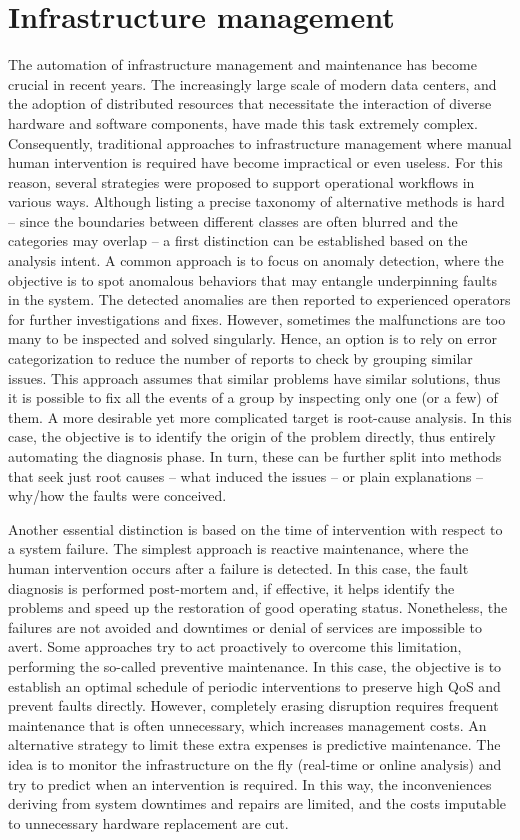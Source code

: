 \chapter{Infrastructure management} \label{ch:opint}
The automation of infrastructure management and maintenance has become crucial in recent years. 
The increasingly large scale of modern data centers, and the adoption of distributed resources that necessitate the interaction of diverse hardware and software components, have made this task extremely complex. Consequently, traditional approaches to infrastructure management where manual human intervention is required have become impractical or even useless. 
For this reason, several strategies were proposed to support operational workflows in various ways.
Although listing a precise taxonomy of alternative methods is hard -- since the boundaries between different classes are often blurred and the categories may overlap -- a first distinction can be established based on the analysis intent.
A common approach is to focus on anomaly detection, where the objective is to spot anomalous behaviors that may entangle underpinning faults in the system. The detected anomalies are then reported to experienced operators for further investigations and fixes.
However, sometimes the malfunctions are too many to be inspected and solved singularly. Hence, an option is to rely on error categorization to reduce the number of reports to check by grouping similar issues. This approach assumes that similar problems have similar solutions, thus it is possible to fix all the events of a group by inspecting only one (or a few) of them.
A more desirable yet more complicated target is root-cause analysis. In this case, the objective is to identify the origin of the problem directly, thus entirely automating the diagnosis phase.
In turn, these can be further split into methods that seek just root causes -- what induced the issues -- or plain explanations -- why/how the faults were conceived.

Another essential distinction is based on the time of intervention with respect to a system failure. 
The simplest approach is reactive maintenance, where the human intervention occurs after a failure is detected. In this case, the fault diagnosis is performed post-mortem and, if effective, it helps identify the problems and speed up the restoration of good operating status. 
Nonetheless, the failures are not avoided and downtimes or denial of services are impossible to avert.
Some approaches try to act proactively to overcome this limitation, performing the so-called preventive maintenance. In this case, the objective is to establish an optimal schedule of periodic interventions to preserve high QoS and prevent faults directly.
However, completely erasing disruption requires frequent maintenance that is often unnecessary, which increases management costs.
An alternative strategy to limit these extra expenses is predictive maintenance. The idea is to monitor the infrastructure on the fly (real-time or online analysis) and try to predict when an intervention is required. In this way, the inconveniences deriving from system downtimes
and repairs are limited, and the costs imputable to unnecessary hardware replacement are cut.

